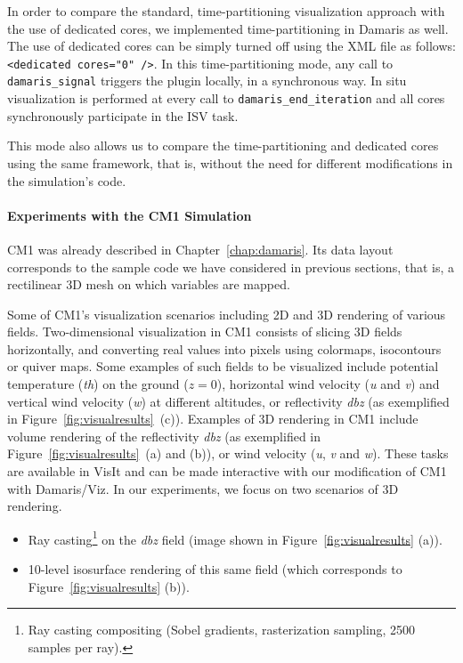 In order to compare the standard, time-partitioning visualization approach with
the use of dedicated cores, we implemented time-partitioning in Damaris as well.
The use of dedicated cores can be simply turned off using the XML file as follows:
\verb+<dedicated cores="0" />+. In this time-partitioning mode, any call to \texttt{damaris\_signal} 
triggers the plugin locally, in a synchronous way. In situ visualization is performed at every call
to \texttt{damaris\_end\_iteration} and all cores synchronously participate in the ISV task.

This mode also allows us to compare the time-partitioning and dedicated cores
using the same framework, that is, without the need for different modifications in the
simulation's code.

\paragraph{Experiments with the CM1 Simulation}
CM1 was already described in Chapter~\ref{chap:damaris}.
Its data layout corresponds to the sample code we have 
considered in previous sections, that is, a rectilinear 3D mesh 
on which variables are mapped.

Some of CM1's visualization scenarios including 2D and 3D rendering of various fields.
Two-dimensional visualization in CM1 consists of slicing 3D fields 
horizontally, and converting real values into pixels using colormaps, 
isocontours or quiver maps. Some examples of such fields to be visualized include potential 
temperature (\emph{th}) on the ground ($z = 0$), horizontal wind velocity
(\emph{u} and \emph{v}) and vertical wind velocity (\emph{w}) at different 
altitudes, or reflectivity \emph{dbz} (as exemplified in Figure~\ref{fig:visualresults}~(c)). 
Examples of 3D rendering in CM1 include volume rendering of the reflectivity \emph{dbz} (as 
exemplified in Figure~\ref{fig:visualresults}~(a) and (b)),
or wind velocity (\emph{u}, \emph{v} and \emph{w}).
These tasks are available in VisIt and can be made interactive with our
modification of CM1 with Damaris/Viz.
In our experiments, we focus on two scenarios of 3D rendering. 
\begin{itemize}

	\item Ray casting\footnote{Ray casting 
	compositing (Sobel gradients, rasterization sampling, 2500 samples per ray).}
	on the \emph{dbz} field (image shown in Figure~\ref{fig:visualresults} (a)).

	\item 10-level isosurface rendering of this same field (which corresponds 
	to Figure~\ref{fig:visualresults} (b)).
	
\end{itemize}

